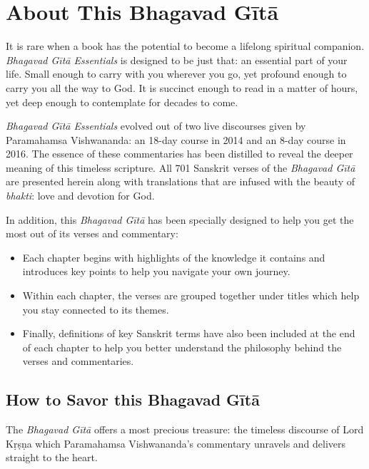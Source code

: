 \chapter{About This Bhagavad Gītā}\label{chap-about-this-bhagavad-gita}

It is rare when a book has the potential to become a lifelong spiritual companion. \textit{Bhagavad Gītā Essentials} is designed to be just that: an essential part of your life. Small enough to carry with you wherever you go, yet profound enough to carry you all the way to God. It is succinct enough to read in a matter of hours, yet deep enough to contemplate for decades to come. 

\textit{Bhagavad Gītā Essentials} evolved out of two live discourses given by Paramahamsa Vishwananda: an 18-day course in 2014 and an 8-day course in 2016. The essence of these commentaries has been distilled to reveal the deeper meaning of this timeless scripture. All 701 Sanskrit verses of the \textit{Bhagavad Gītā} are presented herein along with translations that are infused with the beauty of \textit{bhakti}: love and devotion for God. 

In addition, this \textit{Bhagavad Gītā} has been specially designed to help you get the most out of its verses and commentary:
\begin{itemize}[itemsep=1pt, topsep=6pt]
    \item Each chapter begins with highlights of the knowledge it contains and introduces key points to help you navigate your own journey.

    \item Within each chapter, the verses are grouped together under titles which help you stay connected to its themes.

    \item Finally, definitions of key Sanskrit terms have also been included at the end of each chapter to help you better understand the philosophy behind the verses and commentaries.
\end{itemize}

\section{How to Savor this Bhagavad Gītā}\label{sec-how-to-savor-this-bhagavad-gita}

The \textit{Bhagavad Gītā} offers a most precious treasure: the timeless discourse of Lord Kṛṣṇa which Paramahamsa Vishwananda’s commentary unravels and delivers straight to the heart. 

